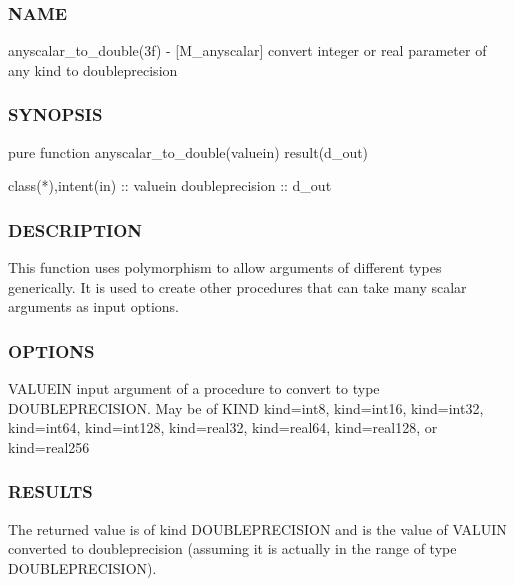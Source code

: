 \subsubsection*{N\+A\+ME}

anyscalar\+\_\+to\+\_\+double(3f) -\/ \mbox{[}M\+\_\+anyscalar\mbox{]} convert integer or real parameter of any kind to doubleprecision 

\subsubsection*{S\+Y\+N\+O\+P\+S\+IS}

\begin{DoxyVerb}pure function anyscalar_to_double(valuein) result(d_out)

 class(*),intent(in)  :: valuein
 doubleprecision      :: d_out
\end{DoxyVerb}


\subsubsection*{D\+E\+S\+C\+R\+I\+P\+T\+I\+ON}

\begin{DoxyVerb}This function uses polymorphism to allow arguments of different types
generically. It is used to create other procedures that can take
many scalar arguments as input options.
\end{DoxyVerb}


\subsubsection*{O\+P\+T\+I\+O\+NS}

\begin{DoxyVerb}VALUEIN  input argument of a procedure to convert to type DOUBLEPRECISION.
         May be of KIND kind=int8, kind=int16, kind=int32, kind=int64,
         kind=int128, kind=real32, kind=real64, kind=real128,
         or kind=real256
\end{DoxyVerb}
 \subsubsection*{R\+E\+S\+U\+L\+TS}

The returned value is of kind D\+O\+U\+B\+L\+E\+P\+R\+E\+C\+I\+S\+I\+ON and is the value of V\+A\+L\+U\+IN converted to doubleprecision (assuming it is actually in the range of type D\+O\+U\+B\+L\+E\+P\+R\+E\+C\+I\+S\+I\+ON).

